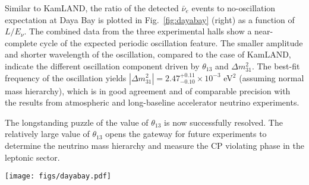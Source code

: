 Similar to KamLAND, the ratio of the detected $\bar\nu_{e}$ events to no-oscillation expectation at Daya Bay is plotted in Fig.~\ref{fig:dayabay} (right) as a function of $L/E_{\nu}$. 
The combined data from the three experimental halls show a near-complete cycle of the expected periodic oscillation feature. 
The smaller amplitude and shorter wavelength of the oscillation, compared to the case of KamLAND, indicate the different oscillation component driven by $\theta_{13}$ and $\Delta{m}^2_{31}$. 
The best-fit frequency of the oscillation yields $|\Delta{m}^2_{31}| = 2.47^{+0.11}_{-0.10} \times 10^{-3}$ eV$^2$ (assuming normal mass hierarchy), which is in good agreement and of comparable precision with the results from atmospheric and long-baseline accelerator neutrino experiments. 

The longstanding puzzle of the value of $\theta_{13}$ is now successfully resolved.
The relatively large value of $\theta_{13}$ opens the gateway for future experiments to determine the neutrino mass hierarchy and measure the CP violating phase in the leptonic sector.

\begin{figure*}[htb] \label{fig:dayabay}
  \centering
  \texttt{[image: figs/dayabay.pdf]}
  \caption{{\bf Daya Bay results}: (left) Ratio of the detected to expected $\bar\nu_{e}$ signals at the 8 antineutrino detectors (ADs) located in three experimental halls as a function of effective baseline. The oscillation survival probability at the best-fit value is given by the red curve.
  (right) Ratio of the background-subtracted $\bar\nu_e$ spectrum to the expectation for no-oscillation in the three experimental halls, re-expressed as a function of $L_{\textrm{eff}}/E_{\nu}$. The effective baseline $L_{\textrm{eff}}$ is determined for each experimental hall (EH) to an effective oscillated flux from a single baseline. The oscillation survival probability using the best estimates of $\theta_{13}$ and $|\Delta{m}^2_{31}|$ is given by the red curve.}
\end{figure*}





